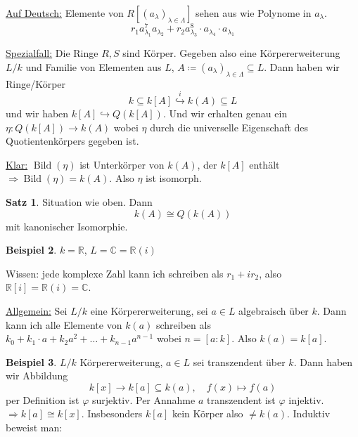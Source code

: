 \documentclass[12pt,parskip=full]{scrartcl}
\newcommand{\setR}{\mathbb{R}}
\newcommand{\setC}{\mathbb{C}}
\newcommand{\heading}{\underline}
\theoremstyle{definition}
\newtheorem{theorem}{Satz}[section]
\newtheorem{example}[theorem]{Beispiel}
\theoremstyle{remark}
\begin{document}
	\heading{Auf Deutsch:} Elemente von $R[(a_\lambda)_{\lambda \in \Lambda}]$ sehen aus wie Polynome in $a_\lambda$.
	\begin{equation*}
		r_1 a_{\lambda_1}^7 a_{\lambda_2} + r_2 a_{\lambda_3}^8 \cdot a_{\lambda_4} \cdot a_{\lambda_1}
	\end{equation*}
	
	\heading{Spezialfall:} Die Ringe $R,S$ sind Körper. Gegeben also eine Körpererweiterung $L/k$ und Familie von Elementen aus $L$, $A \coloneqq (a_\lambda)_{\lambda \in \Lambda} \subseteq L$. Dann haben wir Ringe/Körper
	\begin{equation*}
		k \subseteq k[A] \overset{i}{\hookrightarrow} k(A) \subseteq L
	\end{equation*}
	und wir haben $k[A] \hookrightarrow Q(k[A])$. Und wir erhalten genau ein $\eta: Q(k[A]) \to k(A)$ wobei $\eta$ durch die universelle Eigenschaft des Quotientenkörpers gegeben ist.
	
	\heading{Klar:} $\operatorname{Bild}(\eta)$ ist Unterkörper von $k(A)$, der $k[A]$ enthält $\Rightarrow \operatorname{Bild}(\eta) = k(A)$. Also $\eta$ ist isomorph.
	
	\begin{theorem}
		Situation wie oben. Dann
		\begin{equation*}
			k(A) \cong Q(k(A))
		\end{equation*}
		mit kanonischer Isomorphie.
	\end{theorem}

	\begin{example}
		$k = \setR$, $L = \setC = \setR(i)$
		
		Wissen: jede komplexe Zahl kann ich schreiben als $r_1 + i r_2$, also $\setR[i] = \setR(i) = \setC$.
	\end{example}

	\heading{Allgemein:} Sei $L/k$ eine Körpererweiterung, sei $a \in L$ algebraisch über $k$. Dann kann ich alle Elemente von $k(a)$ schreiben als $k_0 + k_1 \cdot a + k_2 a^2 + \dots + k_{n-1} a^{n-1}$ wobei $n = [a : k]$. Also $k(a) = k[a]$.
	
	\begin{example}
		$L/k$ Körpererweiterung, $a \in L$ sei transzendent über $k$. Dann haben wir Abbildung
		\begin{equation*}
			k[x] \to k[a] \subseteq k(a), \quad f(x) \mapsto f(a)
		\end{equation*}
		per Definition ist $\varphi$ surjektiv. Per Annahme $a$ transzendent ist $\varphi$ injektiv. $\Rightarrow k[a] \cong k[x]$. Insbesonders $k[a]$ kein Körper also $\neq k(a)$. Induktiv beweist man:
	\end{example}
\end{document}
